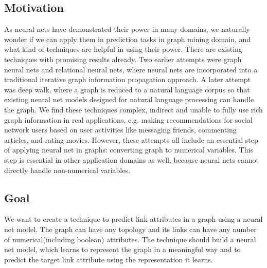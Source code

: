 \documentclass{article}
\begin{document}
\subsection{Motivation}
As neural nets have demonstrated their power in many domains, we naturally wonder if we can apply them in prediction tasks in graph mining domain, and what kind of techniques are helpful in using their power.
There are existing techniques with promising results already.
Two earlier attempts were graph neural nets and relational neural nets\cite{scarselli2009graph}, where neural nets are incorporated into a traditional iterative graph information propagation approach.
A later attempt was deep walk\cite{perozzi2014deepwalk}, where a graph is reduced to a natural language corpus so that existing neural net models designed for natural language processing can handle the graph.
We find these techniques complex, indirect and unable to fully use rich graph information in real applications, e.g. making recommendations for social network users based on user activities like messaging friends, commenting articles, and rating movies.
However, these attempts all include an essential step of applying neural net in graphs: converting graph to numerical variables.
This step is essential in other application domains as well, because neural nets cannot directly handle non-numerical variables.

\subsection{Goal}
We want to create a technique to predict link attributes in a graph using a neural net model. The graph can have any topology and its links can have any number of numerical(including boolean) attributes. The technique should build a neural net model, which learns to represent the graph in a meaningful way and to predict the target link attribute using the representation it learns.
\end{document}
